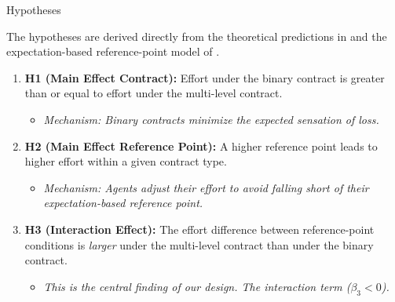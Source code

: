 \documentclass{beamer}
\begin{document}
\begin{frame}{Hypotheses}

    The hypotheses are derived directly from the theoretical predictions in \textcite{Herweg2010} and the expectation-based reference-point model of \textcite{koszegi2007}.

    \vspace{0.3cm}

    \begin{enumerate}
        \item \textbf{H1 (Main Effect Contract):} Effort under the binary contract is greater than or equal to effort under the multi-level contract.
        \begin{itemize}
            \item[\color{gray}\footnotesize$\rightarrow$] \footnotesize\color{gray} \textit{Mechanism: Binary contracts minimize the expected sensation of loss.}
        \end{itemize}
        
        \vspace{0.2cm}
        
        \item \textbf{H2 (Main Effect Reference Point):} A higher reference point leads to higher effort within a given contract type.
        \begin{itemize}
            \item[\color{gray}\footnotesize$\rightarrow$] \footnotesize\color{gray} \textit{Mechanism: Agents adjust their effort to avoid falling short of their expectation-based reference point.}
        \end{itemize}
        
        \vspace{0.2cm}
        
        \item \textbf{H3 (Interaction Effect):} The effort difference between reference-point conditions is \emph{larger} under the multi-level contract than under the binary contract.
        \begin{itemize}
            \item[\color{gray}\footnotesize$\rightarrow$] \footnotesize\color{gray} \textit{This is the central finding of our design. The interaction term ($\beta_3 < 0$).}
        \end{itemize}
    \end{enumerate}

\end{frame}
\end{document}
